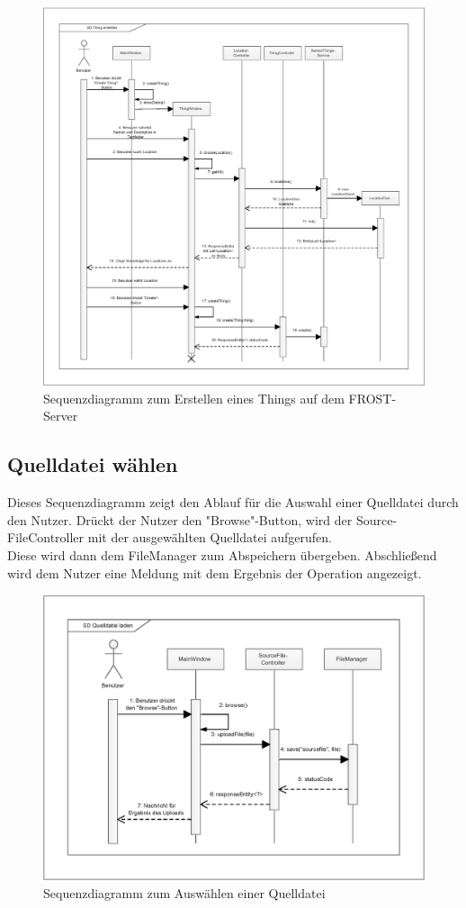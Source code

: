 \vspace{\fill}

\begin{figure}[htbp]
\centering
\includegraphics[scale=0.52]{uml/eps/SD_createThing.eps}
\caption{Sequenzdiagramm zum Erstellen eines Things auf dem FROST-Server}
\end{figure}

\vspace{\fill}
\clearpage
\subsection{Quelldatei wählen}
Dieses Sequenzdiagramm zeigt den Ablauf für die Auswahl einer Quelldatei durch den Nutzer.
Drückt der Nutzer den "{Browse}"{-Button}, wird der Source-FileController mit der ausgewählten Quelldatei aufgerufen.\\
Diese wird dann dem FileManager zum Abspeichern übergeben.
Abschließend wird dem Nutzer eine Meldung mit dem Ergebnis der Operation angezeigt.

\vspace{\fill}
\begin{figure}[htbp]
\centering
\includegraphics[scale=0.7]{uml/eps/SD_sourceFile.eps}
\caption{Sequenzdiagramm zum Auswählen einer Quelldatei}
\end{figure}

\vspace{\fill}